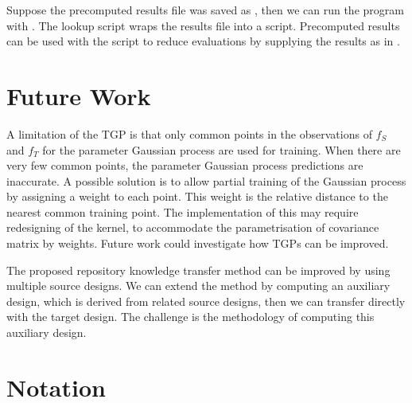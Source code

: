 \documentclass[10pt,a4paper]{article}
\begin{document}
Suppose the precomputed results file was saved as , then we can run the program with . The lookup script wraps the results file into a script. Precomputed results can be used with the script to reduce evaluations by supplying the results as in .

\section{Future Work}

A limitation of the TGP is that only common points in the observations of $f_S$ and $f_T$ for the parameter Gaussian process are used for training. When there are very few common points, the parameter Gaussian process predictions are inaccurate. A possible solution is to allow partial training of the Gaussian process by assigning a weight to each point. This weight is the relative distance to the nearest common training point. The implementation of this may require redesigning of the kernel, to accommodate the parametrisation of covariance matrix by weights. Future work could investigate how TGPs can be improved.

The proposed repository knowledge transfer method can be improved by using multiple source designs. We can extend the method by computing an auxiliary design, which is derived from related source designs, then we can transfer directly with the target design. The challenge is the methodology of computing this auxiliary design.

\section{Notation}
\end{document}
